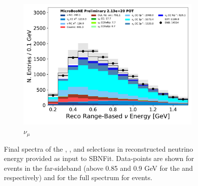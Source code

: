 \begin{figure}[ht]
\begin{center}
\begin{subfigure}[b]{0.31\textwidth}
    \includegraphics[width=1.00\textwidth]{NuMuCCsel/Images/Ryan/fullselection_run3_fullsystematics/reco_nu_e_range_v_08052020_fullsel_samples_noratio_event_category.pdf}
    \caption{\label{fig:intro:nueselections:numu} $\nu_{\mu}$}
    \end{subfigure}
\caption{\label{fig:intro:nueselections} Final spectra of the \npsel, \zpsel, and \numu selections in reconstructed neutrino energy provided as input to SBNFit. Data-points are shown for \nue events in the far-sideband (above 0.85 and 0.9 GeV for the \npsel and \zpsel respectively) and for the full spectrum for \numu events.}
\end{center}
\end{figure}


